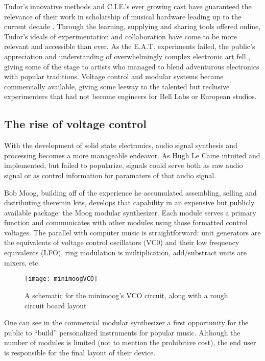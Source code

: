 \begin{itemize}
\begin{quote}
\end{quote}

Tudor’s innovative methods and C.I.E.’s ever growing cast have guaranteed the relevance of their work in scholarship of musical hardware leading up to the current decade \citep{collins2004,collins2006,collins2008,collins2010,nakai2014,driscoll2004,kuivila2004}. Through the learning, supplying and sharing tools offered online, Tudor’s ideals of experimentation and collaboration have come to be more relevant and accessible than ever. As the E.A.T. experiments failed, the public's appreciation and understanding of overwhelmingly complex electronic art fell \citep{burnham1979}, giving some of the stage to artists who managed to blend adventurous electronics with popular traditions. Voltage control and modular systems became commercially available, giving some leeway to the talented but reclusive experimenters that had not become engineers for Bell Labs or European studios. 

\subsection{The rise of voltage control}

With the development of solid state electronics, audio signal synthesis and processing becomes a more manageable endeavor. As Hugh Le Caine intuited and implemented, but failed to popularize, signals could serve both as raw audio signal or as control information for paramaters of that audio signal. 

Bob Moog, building off of the experience he accumulated assembling, selling and distributing theremin kits, develops that capability in an expensive but publicly available package: the Moog modular synthesizer. Each module serves a primary function and communicates with other modules using those formatted control voltages. The parallel with computer music is straightforward: unit generators are the equivalents of voltage control oscillators (VC0) and their low frequency equivalents (LFO), ring modulation is multiplication, add/substract units are mixers, etc. 

	\begin{figure}[h!]
	  \caption{A schematic for the minimoog's VCO circuit, along with a rough circuit board layout}
	  \centering
	    \texttt{[image: minimoogVCO]}
	\end{figure}

One can see in the commercial modular synthesizer a first opportunity for the public to ``build'' personalized instruments for popular music. Although the number of modules is limited (not to mention the prohibitive cost), the end user is responsible for the final layout of their device. 


\end{itemize}
